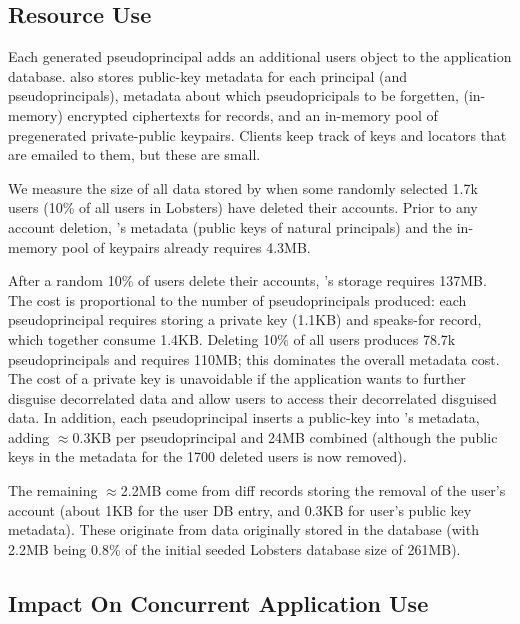 \subsection{Resource Use}
\label{s:eval-res}

%
Each generated pseudoprincipal adds an additional users object to the application database.
%
\sys also stores public-key metadata for each principal (and pseudoprincipals), metadata about which
pseudopricipals to be forgetten, (in-memory) encrypted ciphertexts for records, and an in-memory pool
of pregenerated private-public keypairs.
%
Clients keep track of keys and locators that are emailed to them, but these are small.
%

We measure the size of all data stored by \sys when some randomly selected 1.7k users (10\% of all
users in Lobsters) have deleted their accounts.
Prior to any account deletion, \sys's metadata (public keys of natural principals) and the in-memory
pool of keypairs already requires 4.3MB.

After a random 10\% of users delete their accounts, \sys's storage requires 137MB. The cost is
proportional to the number of pseudoprincipals produced: each pseudoprincipal requires storing a
private key (1.1KB) and speaks-for record, which together consume 1.4KB. Deleting 10\% of all users
produces 78.7k pseudoprincipals and requires 110MB; this dominates the overall metadata cost.
The cost of a private key is unavoidable if the application wants to further disguise decorrelated
data and allow users to access their decorrelated disguised data.
%
In addition, each pseudoprincipal inserts a public-key into \sys's metadata, adding $\approx$0.3KB
per pseudoprincipal and 24MB combined (although the public keys in the metadata for the 1700 deleted
users is now removed).

The remaining $\approx$2.2MB come from diff records storing the removal of the user's account (about
1KB for the user DB entry, and 0.3KB for user's public key metadata). These originate from data
originally stored in the database (with 2.2MB being 0.8\% of the initial seeded Lobsters database
size of 261MB).

\subsection{Impact On Concurrent Application Use}
\label{s:eval-conc}

